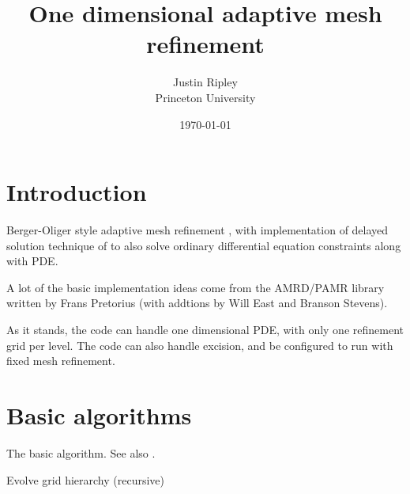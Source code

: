 \documentclass[10pt,letter]{article}
\begin{document}
\title{One dimensional adaptive mesh refinement}    
\author{Justin Ripley
	\\Princeton University}
\date{\today}
 
\maketitle 
     
\section{Introduction}
	Berger-Oliger style adaptive mesh refinement \cite{Berger:1984zza},
with implementation of delayed solution technique of \cite{Pretorius:2005ua}
to also solve ordinary differential equation constraints along with PDE.

       A lot of the basic implementation ideas come from the AMRD/PAMR
library written by Frans Pretorius
(with addtions by Will East and Branson Stevens).  

	As it stands, the code can handle one dimensional PDE, with only
one refinement grid per level. The code can also handle excision, and
be configured to run with fixed mesh refinement.
\section{Basic algorithms}

	The basic algorithm. See also \cite{Berger:1984zza,Pretorius:2005ua}. 

\begin{algorithm}
\caption{Evolve grid hierarchy (recursive)}\label{alg:time_step}
\begin{algorithmic}[1]
			\State{}
		\EndIf 
		\EndIf
		\EndIf
	\EndFor
	\EndIf
\EndProcedure
\end{algorithmic}
\end{algorithm}



\end{document}
